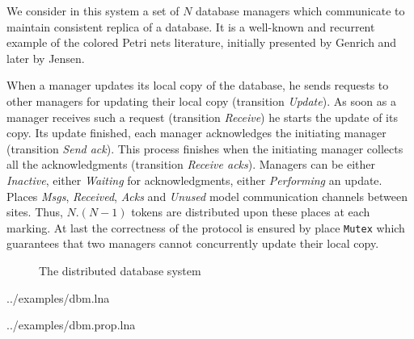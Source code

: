 We consider in this system a set of $N$ database managers which
communicate to maintain consistent replica of a database.  It is a
well-known and recurrent example of the colored Petri nets literature,
initially presented by Genrich and later by Jensen.

When a manager updates its local copy of the database, he sends
requests to other managers for updating their local copy (transition
{\it Update}). As soon as a manager receives such a request
(transition {\it Receive}) he starts the update of its copy. Its
update finished, each manager acknowledges the initiating manager
(transition {\it Send ack}).  This process finishes when the
initiating manager collects all the acknowledgments (transition {\it
Receive acks}). Managers can be either {\it Inactive}, either {\it
Waiting} for acknowledgments, either {\it Performing} an
update. Places {\it Msgs}, {\it Received}, {\it Acks} and {\it Unused}
model communication channels between sites. Thus, $N.(N-1)$ tokens are
distributed upon these places at each marking. At last the correctness
of the protocol is ensured by place \lstinline{Mutex} which guarantees
that two managers cannot concurrently update their local copy.

\begin{figure}[!h]
\centerline{\scalebox{0.55}{}}
\caption{The distributed database system}
\label{fig_dbm}
\end{figure}

 {../examples/dbm.lna}

 {../examples/dbm.prop.lna}

